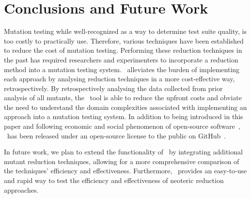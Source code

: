 \section{Conclusions and Future Work}

Mutation testing while well-recognized as a way to determine test suite quality, is too costly
to practically use. Therefore, various techniques have been established to reduce the cost
of mutation testing. Performing these reduction techniques in the past has required researchers
and experimenters to incorporate a reduction method into a mutation testing system. \mr~alleviates
the burden of implementing each approach by analysing reduction techniques in a more cost-effective
way, retrospectively. By retrospectively analysing the data collected from prior analysis of all
mutants, the \mr~tool is able to reduce the upfront costs and obviate the need to understand the
domain complexities associated with implementing an approach into a mutation testing system.
In addition to being introduced in this paper and following economic and social phenomenon of
open-source software~\cite{hippel2003open}, \mr~has been released under an open-source license
to the public on GitHub~\cite{github}.

In future work, we plan to extend the functionality of \mr~by integrating additional
mutant reduction techniques, allowing for a more comprehensive comparison of the techniques'
efficiency and effectiveness. Furthermore, \mr~provides an easy-to-use and rapid
way to test the efficiency and effectiveness of neoteric reduction approaches.

